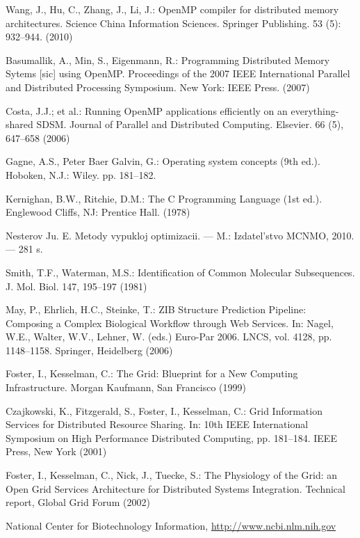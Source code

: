 \documentclass[runningheads,a4paper]{llncs}
\begin{document}
\begin{thebibliography}{4}

 Wang, J., Hu, C., Zhang, J., Li, J.: OpenMP compiler for distributed memory architectures. Science China Information Sciences. Springer Publishing. 53 (5): 932–944. (2010)

 Basumallik, A., Min, S., Eigenmann, R.: Programming Distributed Memory Sytems [sic] using OpenMP. Proceedings of the 2007 IEEE International Parallel and Distributed Processing Symposium. New York: IEEE Press. (2007)

 Costa, J.J.; et al.: Running OpenMP applications efficiently on an everything-shared SDSM. Journal of Parallel and Distributed Computing. Elsevier. 66 (5), 647–658 (2006)

 Gagne, A.S., Peter Baer Galvin, G.: Operating system concepts (9th ed.). Hoboken, N.J.: Wiley. pp. 181–182. 

 Kernighan, B.W., Ritchie, D.M.: The C Programming Language (1st ed.). Englewood Cliffs, NJ: Prentice Hall. (1978)

 Nesterov Ju. E. Metody vypukloj optimizacii. — M.: Izdatel'stvo MCNMO, 2010. — 281 s.

 Smith, T.F., Waterman, M.S.: Identification of Common Molecular
Subsequences. J. Mol. Biol. 147, 195--197 (1981)

 May, P., Ehrlich, H.C., Steinke, T.: ZIB Structure Prediction Pipeline:
Composing a Complex Biological Workflow through Web Services. In: Nagel,
W.E., Walter, W.V., Lehner, W. (eds.) Euro-Par 2006. LNCS, vol. 4128,
pp. 1148--1158. Springer, Heidelberg (2006)

 Foster, I., Kesselman, C.: The Grid: Blueprint for a New Computing
Infrastructure. Morgan Kaufmann, San Francisco (1999)

 Czajkowski, K., Fitzgerald, S., Foster, I., Kesselman, C.: Grid
Information Services for Distributed Resource Sharing. In: 10th IEEE
International Symposium on High Performance Distributed Computing, pp.
181--184. IEEE Press, New York (2001)

 Foster, I., Kesselman, C., Nick, J., Tuecke, S.: The Physiology of the
Grid: an Open Grid Services Architecture for Distributed Systems
Integration. Technical report, Global Grid Forum (2002)

 National Center for Biotechnology Information, \url{http://www.ncbi.nlm.nih.gov}

\end{thebibliography}
\end{document}
